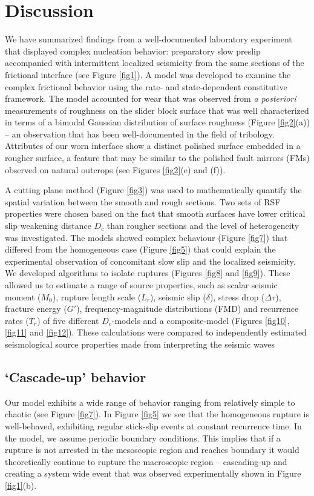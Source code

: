 \documentclass[preprint,1p, 10pt,authoryear]{elsarticle}
\begin{document}
\section{Discussion}
We have summarized findings from a well-documented laboratory experiment \citep{Selvadurai2015, Selvadurai2017, Selvadurai2019} that displayed 
complex nucleation behavior: preparatory slow preslip accompanied with intermittent localized seismicity from the same sections of the frictional interface (see Figure \ref{fig1}). A model was developed to examine the complex frictional behavior using the rate- and state-dependent constitutive framework. The model accounted for wear that was observed from \textit{a posteriori} measurements of roughness on the slider block surface that was well characterized in terms of a bimodal Gaussian distribution of surface roughness (Figure \ref{fig2}(a)) -- an observation that has been well-documented in the field of tribology. Attributes of our worn interface show a distinct polished surface embedded in a rougher surface, a feature that may be similar to the polished fault mirrors (FMs) observed on natural outcrops (see Figures \ref{fig2}(e) and (f)).

A cutting plane method (Figure \ref{fig3}) was used to mathematically quantify the spatial variation between the smooth and rough sections. Two sets of RSF properties were chosen based on the fact that smooth surfaces have lower critical slip weakening distance $D_{c}$ than rougher sections and the level of heterogeneity was investigated. The models showed complex behaviour (Figure \ref{fig7}) that differed from the homogeneous case (Figure \ref{fig5}) that could explain the experimental observation of concomitant slow slip and the localized seismicity.  We developed algorithms to isolate ruptures (Figures \ref{fig8} and \ref{fig9}).  These allowed us to estimate a range of source properties, such as scalar seismic moment ($M_{0}$), rupture length scale ($L_{r}$), seismic slip ($\delta$), stress drop ($\Delta\tau$), fracture energy ($G'$), frequency-magnitude distributions (FMD) and recurrence rates ($T_{r}$) of five different $D_{c}$-models and a composite-model (Figures \ref{fig10}, \ref{fig11} and \ref{fig12}). These calculations were compared to independently estimated seismological source properties made from interpreting the seismic waves \citep{Selvadurai2019}

\subsection{`Cascade-up' behavior}
\label{Cascade_UP}
Our model exhibits a wide range of behavior ranging from relatively simple to chaotic (see Figure \ref{fig7}). In Figure \ref{fig5} we see that the homogeneous rupture is well-behaved, exhibiting regular stick-slip events at constant recurrence time.  In the model, we assume periodic boundary conditions. This implies that if a rupture is not arrested in the mesoscopic region and reaches boundary it would theoretically continue to rupture the macroscopic region -- cascading-up and creating a system wide event that was observed experimentally shown in Figure \ref{fig1}(b). 
\end{document}
